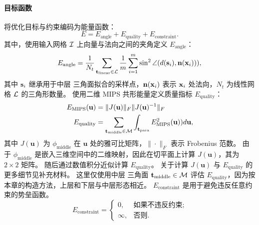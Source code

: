 \paragraph{目标函数}
将优化目标与约束编码为能量函数：
\begin{equation}\label{equ:enenrgy}
	E = E_{\text{angle}} + E_{\text{quality}} + E_\text{constraint}.
\end{equation}
其中，使用输入网格 $\mathcal{I}$ 上向量与法向之间的夹角定义 $E_{\text{angle}}$：
\begin{equation}\label{equ:angle}
 E_{\text{angle}} = \frac{1}{N_t} \sum_{\mathbf{t}_{\text{linear}} \in \mathcal{L}} \frac{1}{m} \sum_{i=1}^{m} \sin^2 \angle (d(\mathbf{s}_i), \mathbf{n}(\mathbf{x}_i))),
\end{equation}
其中 $\mathbf{s}_i$ 继承用于中层 \Bezier 三角面拟合的采样点，$\mathbf{n}(\mathbf{x}_i)$ 表示 $\mathbf{x}_i$ 处法向，$N_t$ 为线性网格 $\mathcal{L}$ 的三角形数量。
%
使用二维 MIPS 共形能量定义质量指标 $E_{\text{quality}}$：
\begin{equation}\label{equ:quality}
\begin{split}
  E_{\text{MIPS}}(\mathbf{u}) &= \|J(\mathbf{u})\|_F \|J(\mathbf{u})^{-1}\|_F \\
  E_{\text{quality}} &= \sum_{\mathbf{t}_\text{middle} \in \mathcal{M}}  \int_{\mathbf{t}_\text{para}} E_{\text{MIPS}}^2(\mathbf{u})) d \mathbf{u},
\end{split}
\end{equation}
其中 $J(\mathbf{u})$ 为 $\phi_\text{middle}$ 在 $\mathbf{u}$ 处的雅可比矩阵，$\|\cdot\|_F$ 表示 Frobenius 范数。
由于 $\phi_\text{middle}$ 是嵌入三维空间中的二维映射，因此在切平面上计算 $J(\mathbf{u})$，其为 $2 \times 2$ 矩阵。
随后通过数值积分近似计算 $E_{\text{quality}}$。
关于计算 $J(\mathbf{u})$ 与 $E_\text{quality}$ 的更多细节见补充材料。
这里仅使用中层 \Bezier 三角面 $\mathbf{t}_\text{middle} \in \mathcal{M}$ 评估 $E_{\text{quality}}$，因为按本章的构造方法，上层和下层与中层形态相近。
%
$E_\text{constraint}$ 是用于避免违反任意约束的势垒函数。
\begin{equation}\label{equ:constraint}
    E_\text{constraint} =
    \begin{cases}
        0,      &\text{如果不违反约束;}  \\
	 	\infty, &\text{否则.}
    \end{cases}
\end{equation}

